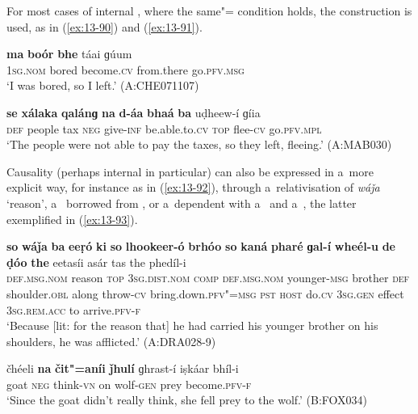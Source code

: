 For most cases of internal , where the same"= condition holds, the  construction is used, as in (\ref{ex:13-90}) and (\ref{ex:13-91}).

\begin{exe}
\ex
\label{ex:13-90}
\gll \textbf{ma} \textbf{boór} \textbf{bhe} táai ɡúum  \\
\textsc{1sg.nom} bored become.\textsc{cv} from.there go.\textsc{pfv.msg}  \\
\glt `I was bored, so I left.' (A:CHE071107)

\ex
\label{ex:13-91}
\gll \textbf{se} \textbf{xálaka} \textbf{qalánɡ} \textbf{na} \textbf{d-áa} \textbf{bhaá} \textbf{ba} uḍheew-í ɡíia \\
 \textsc{def} people tax \textsc{neg} give-\textsc{inf} be.able.to.\textsc{cv} \textsc{top} flee-\textsc{cv}  go.\textsc{pfv.mpl}   \\
\glt `The people were not able to pay the taxes, so they left, fleeing.' (A:MAB030) 
\end{exe}

Causality (perhaps internal in particular) can also be expressed in a~more explicit way, for instance as in (\ref{ex:13-92}), through a~relativisation of \textit{wáǰa} `reason', a~ borrowed from \iliPashto, or a~dependent  with a~ and a~, the latter exemplified in (\ref{ex:13-93}).

\begin{exe}
\ex
\label{ex:13-92}
\gll \textbf{so} \textbf{wáǰa} \textbf{ba} \textbf{eeṛó} \textbf{ki} \textbf{so} \textbf{lhookeer-ó} \textbf{brhóo} \textbf{so} \textbf{kaná} \textbf{pharé} \textbf{ɡal-í} \textbf{wheél-u} \textbf{de} \textbf{ḍóo} \textbf{the} eetasíi asár tas the phedíl-i \\
\textsc{def.msg.nom} reason \textsc{top} \textsc{3sg.dist.nom} \textsc{comp} \textsc{def.msg.nom} younger-\textsc{msg} brother \textsc{def}{\protect\footnotemark} shoulder.\textsc{obl} along throw-\textsc{cv} bring.down.\textsc{pfv"=msg} \textsc{pst} \textsc{host} do.\textsc{cv}  \textsc{3sg.gen} effect \textsc{3sg.rem.acc} to arrive.\textsc{pfv-f} \\
\glt `Because [lit: for the reason that] he had carried his younger brother on his shoulders, he was afflicted.' (A:DRA028-9)

\ex
\label{ex:13-93}
\gll čhéeli \textbf{na} \textbf{čit"=aníi} \textbf{ǰhulí} ɡhrast-í iṣkáar bhíl-i \\
goat \textsc{neg} think-\textsc{vn} on wolf-\textsc{gen} prey become.\textsc{pfv-f}  \\
\glt `Since the goat didn't really think, she fell prey to the wolf.' (B:FOX034)
\end{exe}

